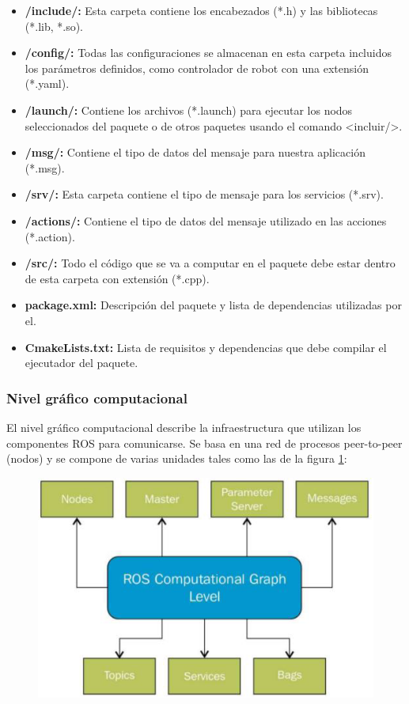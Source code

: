             \begin{itemize}
                \item {\textbf{/include/:} Esta carpeta contiene los encabezados (*.h) y las bibliotecas (*.lib, *.so).}
                \item {\textbf{/config/:} Todas las configuraciones se almacenan en esta carpeta incluidos los parámetros definidos, como controlador de robot con una extensión (*.yaml).}
                \item {\textbf{/launch/:} Contiene los archivos (*.launch) para ejecutar los nodos seleccionados del paquete o de otros paquetes usando el comando <incluir/>.}
                \item {\textbf{/msg/:} Contiene el tipo de datos del mensaje para nuestra aplicación (*.msg).}
                \item {\textbf{/srv/:} Esta carpeta contiene el tipo de mensaje para los servicios (*.srv).}
                \item {\textbf{/actions/:} Contiene el tipo de datos del mensaje utilizado en las acciones (*.action). }
                \item {\textbf{/src/:} Todo el código que se va a computar en el paquete debe estar dentro de esta carpeta con extensión (*.cpp).}
                \item {\textbf{package.xml:} Descripción del paquete y lista de dependencias utilizadas por el.}
                \item {\textbf{CmakeLists.txt:} Lista de requisitos y dependencias que debe compilar el ejecutador del paquete.}
            \end{itemize}


            \subsubsection{Nivel gráfico computacional}
            
            El nivel gráfico computacional describe la infraestructura que utilizan los componentes ROS para comunicarse. Se basa en una red de procesos peer-to-peer (nodos) y se compone de varias unidades tales como las de la figura \ref{f:Cap3_conceptos_5}:
            
            \begin{figure}[htb]
                \centering
                \includegraphics[width=0.5\linewidth]{Main/Chapter3/Images3/n_s_a_5.png}
                \caption{}
                \label{f:Cap3_conceptos_5}
            \end{figure} 
            
